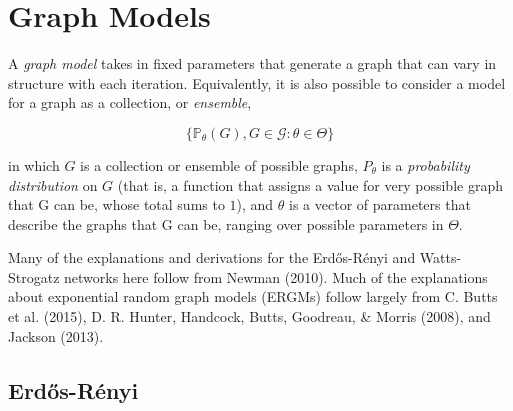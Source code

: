 \documentclass[12pt,twoside]{amherstthesis}
\begin{document}
  \chapter{Graph Models}\label{graph-models}
  
  A \emph{graph model} takes in fixed parameters that generate a graph
  that can vary in structure with each iteration. Equivalently, it is also
  possible to consider a model for a graph as a collection, or
  \emph{ensemble},
  
  \[\{\mathbb{P}_{\theta}(G), G \in \mathcal{G}: \theta \in \Theta\}\]
  
  in which \(G\) is a collection or ensemble of possible graphs,
  \(P_\theta\) is a \emph{probability distribution} on \(G\) (that is, a
  function that assigns a value for very possible graph that G can be,
  whose total sums to \(1\)), and \(\theta\) is a vector of parameters
  that describe the graphs that G can be, ranging over possible parameters
  in \(\Theta\).
  
  Many of the explanations and derivations for the Erdős-Rényi and
  Watts-Strogatz networks here follow from Newman (2010). Much of the
  explanations about exponential random graph models (ERGMs) follow
  largely from C. Butts et al. (2015), D. R. Hunter, Handcock, Butts,
  Goodreau, \& Morris (2008), and Jackson (2013).
  
  \section{Erdős-Rényi}\label{erdos-renyi}
  
\end{document}
